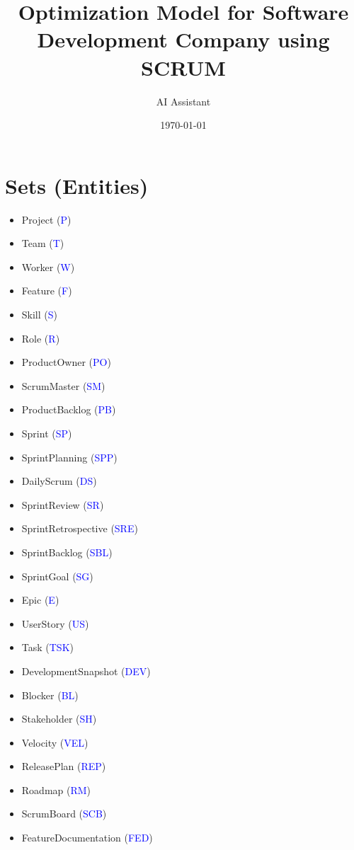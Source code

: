 \documentclass{article}
\begin{document}
\title{Optimization Model for Software Development Company using SCRUM}
\author{AI Assistant}
\date{\today}
\maketitle
\tableofcontents
\newpage

\section{Sets (Entities)}
\begin{itemize}[leftmargin=*]
  \item Project (\textcolor{blue}{P})
  \item Team (\textcolor{blue}{T})
  \item Worker (\textcolor{blue}{W})
  \item Feature (\textcolor{blue}{F})
  \item Skill (\textcolor{blue}{S})
  \item Role (\textcolor{blue}{R})
  \item ProductOwner (\textcolor{blue}{PO})
  \item ScrumMaster (\textcolor{blue}{SM})
  \item ProductBacklog (\textcolor{blue}{PB})
  \item Sprint (\textcolor{blue}{SP})
  \item SprintPlanning (\textcolor{blue}{SPP})
  \item DailyScrum (\textcolor{blue}{DS})
  \item SprintReview (\textcolor{blue}{SR})
  \item SprintRetrospective (\textcolor{blue}{SRE})
  \item SprintBacklog (\textcolor{blue}{SBL})
  \item SprintGoal (\textcolor{blue}{SG})
  \item Epic (\textcolor{blue}{E})
  \item UserStory (\textcolor{blue}{US})
  \item Task (\textcolor{blue}{TSK})
  \item DevelopmentSnapshot (\textcolor{blue}{DEV})
  \item Blocker (\textcolor{blue}{BL})
  \item Stakeholder (\textcolor{blue}{SH})
  \item Velocity (\textcolor{blue}{VEL})
  \item ReleasePlan (\textcolor{blue}{REP})
  \item Roadmap (\textcolor{blue}{RM})
  \item ScrumBoard (\textcolor{blue}{SCB})
  \item FeatureDocumentation (\textcolor{blue}{FED})
\end{itemize}
\end{document}
